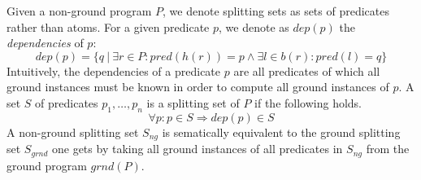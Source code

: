 \begin{definition}
\label{def:prelims-asp-semantics-nonground-splitting-set}
Given a non-ground program $P$, we denote splitting sets as sets of predicates rather than atoms. 
For a given predicate $p$, we denote as $dep(p)$ the \emph{dependencies} of $p$:
 \[
	dep(p) = \{q~|~\exists r \in P: pred(h(r)) = p \land \exists l \in b(r): pred(l) = q\}
\]
Intuitively, the dependencies of a predicate $p$ are all predicates of which all ground instances must be known in order to compute all ground instances of $p$.
A set $S$ of predicates $p_1,\ldots,p_n$ is a splitting set of $P$ if the following holds. 
\[
	\forall p:  p \in S \Rightarrow dep(p) \in S
\]
A non-ground splitting set $S_{ng}$ is sematically equivalent to the ground splitting set $S_{grnd}$ one gets by taking all ground instances of all predicates in $S_{ng}$ from the ground program $grnd(P)$.
\end{definition}


